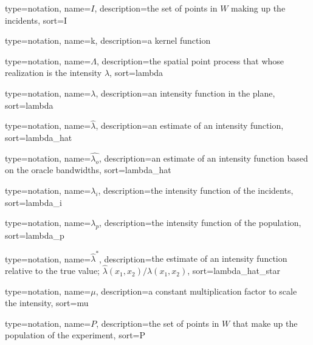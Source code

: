 {%
   type=notation,
   name={\ensuremath{I}},
   description={the set of points in \ensuremath{W} making up the incidents},
   sort={I}
}

{%
   type=notation,
   name={k},
   description={a kernel function}
}

{%
   type=notation,
   name={\ensuremath{\Lambda}},
   description={the spatial point process that whose realization is the intensity \ensuremath{\lambda}},
   sort={lambda}
}

{%
   type=notation,
   name={\ensuremath{\lambda}},
   description={an intensity function in the plane},
   sort={lambda}
}

{%
   type=notation,
   name={\ensuremath{\hat{\lambda}}},
   description={an estimate of an intensity function},
   sort={lambda_hat}
}

{%
   type=notation,
   name={\ensuremath{\hat{\lambda_o}}},
   description={an estimate of an intensity function based on the oracle bandwidths},
   sort={lambda_hat}
}

{%
   type=notation,
   name={\ensuremath{\lambda_i}},
   description={the intensity function of the incidents},
   sort={lambda_i}
}

{%
   type=notation,
   name={\ensuremath{\lambda_p}},
   description={the intensity function of the population},
   sort={lambda_p}
}

{%
   type=notation,
   name={\ensuremath{\hat{\lambda}^*}},
   description={the estimate of an intensity function relative to the true value; \ensuremath{\hat{\lambda}(x_1, x_2)/\lambda(x_1, x_2)}},
   sort={lambda_hat_star}
}

{%
   type=notation,
   name={\ensuremath{\mu}},
   description={a constant multiplication factor to scale the intensity},
   sort={mu}
}

{%
   type=notation,
   name={\ensuremath{P}},
   description={the set of points in \ensuremath{W} that make up the population of the experiment},
   sort={P}
}

